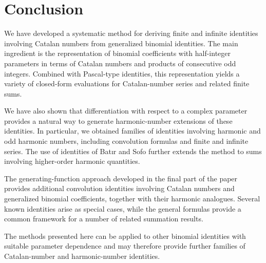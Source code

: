\documentclass[12pt,reqno]{article}
\begin{document}
\section{Conclusion}

We have developed a systematic method for deriving finite and infinite identities involving Catalan numbers from generalized binomial identities. The main ingredient is the representation of binomial coefficients with half-integer parameters in terms of Catalan numbers and products of consecutive odd integers. Combined with Pascal-type identities, this representation yields a variety of closed-form evaluations for Catalan-number series and related finite sums.

We have also shown that differentiation with respect to a complex parameter provides a natural way to generate harmonic-number extensions of these identities. In particular, we obtained families of identities involving harmonic and odd harmonic numbers, including convolution formulas and finite and infinite series. The use of identities of Bat{\i}r and Sofo further extends the method to sums involving higher-order harmonic quantities.

The generating-function approach developed in the final part of the paper provides additional convolution identities involving Catalan numbers and generalized binomial coefficients, together with their harmonic analogues. Several known identities arise as special cases, while the general formulas provide a common framework for a number of related summation results.

The methods presented here can be applied to other binomial identities with suitable parameter dependence and may therefore provide further families of Catalan-number and harmonic-number identities.
\end{document}
